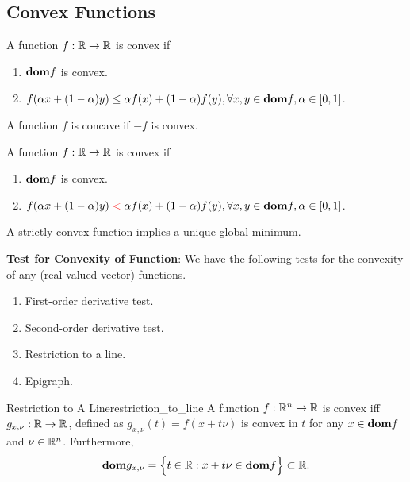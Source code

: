 \subsection{Convex Functions}
\begin{definition}
	A function $f:\mathbb{R}\to\mathbb{R}$ is convex if
	\begin{enumerate}[label=(\roman*)]
		\item ${\mathrm{\bf dom}} f$ is convex.
		\item $f(\alpha x + (1-\alpha)y) \le \alpha f(x) + (1-\alpha)f(y), \forall x, y\in{\mathrm{\bf dom}} f, \alpha\in [0,1]$.
	\end{enumerate} 

	\noindent A function $f$ is concave if $-f$ is convex.
\end{definition}


\begin{definition}
	A function $f:\mathbb{R}\to\mathbb{R}$ is convex if
	\begin{enumerate}[label=(\roman*)]
		\item ${\mathrm{\bf dom}} f$ is convex.
		\item $f(\alpha x + (1-\alpha)y) \color{red}<\color{black} \alpha f(x) + (1-\alpha)f(y), \forall x, y\in{\mathrm{\bf dom}} f, \alpha\in [0,1]$.
	\end{enumerate} 

	\noindent A strictly convex function implies a unique global minimum.
\end{definition}

\noindent\newline\textbf{Test for Convexity of Function}: We have the following tests for the convexity of any (real-valued vector) functions.
\begin{enumerate}			
	\item First-order derivative test.
	\item Second-order derivative test.
	\item Restriction to a line.
	\item Epigraph.
\end{enumerate} 

\begin{proposition}{Restriction to A Line}{restriction_to_line}
	A function $f:\mathbb{R}^n\to\mathbb{R}$ is convex iff $g_{x, \nu}:\mathbb{R}\to\mathbb{R}$, defined as $g_{x,\nu}(t)=f(x+t\nu)$ is convex in $t$ for any $x\in{\mathrm{\bf dom}} f$ and $\nu\in \mathbb{R}^n$.	Furthermore,
	\begin{equation}
		{\mathrm{\bf dom}} g_{x, \nu} = \Big\{ 
			t\in\mathbb{R}: x+t\nu \in {\mathrm{\bf dom}} f
		 \Big\} \subset \mathbb{R}.
	\end{equation} 
\end{proposition} 


